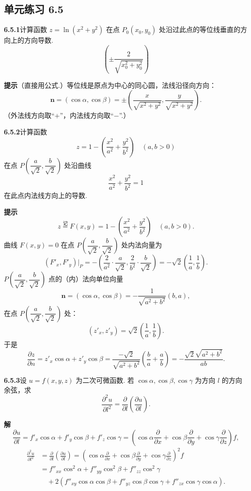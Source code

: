\documentclass[UTF8,12pt,a4paper,fontset=fandol]{ctexart}
\begin{document}
\subsection*{单元练习 6.5}

\noindent\textbf{6.5.1}\quad 计算函数 $z=\ln(x^2+y^2)$ 在点
$P_0(x_0,y_0)$ 处沿过此点的等位线垂直的方向上的方向导数.
\[
  \left(\pm\frac2{\sqrt{x_0^2+y_0^2}}\right)
\]

\noindent\textbf{提示}\quad （直接用公式.）等位线是原点为中心的同心圆，法线沿径向方向：
\[
  \mathbf n=(\cos\alpha,\cos\beta)
  =
  \pm\left(
  \frac{x}{\sqrt{x^2+y^2}},
  \frac{y}{\sqrt{x^2+y^2}}
  \right).
\]
（外法线方向取“$+$”，内法线方向取“$-$”.）

\noindent\textbf{6.5.2}\quad 计算函数
\[
  z=1-\left(\frac{x^2}{a^2}+\frac{y^2}{b^2}\right)\quad(a,b>0)
\]
在点 $P\left(\dfrac a{\sqrt2},\dfrac b{\sqrt2}\right)$ 处沿曲线
\[
  \frac{x^2}{a^2}+\frac{y^2}{b^2}=1
\]
在此点内法线方向上的导数.

\noindent\textbf{提示}\quad
\[
  z\overset{\text{记}}{=}F(x,y)=1-\left(\frac{x^2}{a^2}+\frac{y^2}{b^2}\right)\quad(a,b>0).
\]
曲线 $F(x,y)=0$ 在点
$P\left(\dfrac a{\sqrt2},\dfrac b{\sqrt2}\right)$ 处内法向量为
\[
  (F'_x,F'_y)\big|_P
  =
  -\left(\frac2{a^2}\cdot\frac a{\sqrt2},
  \frac2{b^2}\cdot\frac b{\sqrt2}\right)
  =
  -\sqrt2\left(\frac1a,\frac1b\right).
\]
$P\left(\dfrac a{\sqrt2},\dfrac b{\sqrt2}\right)$ 点的（内）法向单位向量
\[
  \mathbf n=(\cos\alpha,\cos\beta)
  =
  -\frac1{\sqrt{a^2+b^2}}(b,a),
\]
在点 $P\left(\dfrac a{\sqrt2},\dfrac b{\sqrt2}\right)$ 处：
\[
  (z'_x,z'_y)=\sqrt2\left(\frac1a,\frac1b\right).
\]
于是
\[
  \frac{\partial z}{\partial n}
  =
  z'_x\cos\alpha+z'_y\cos\beta
  =
  \frac{-\sqrt2}{\sqrt{a^2+b^2}}\left(\frac ba+\frac ab\right)
  =
  -\frac{\sqrt2\sqrt{a^2+b^2}}{ab}.
\]

\noindent\textbf{6.5.3}\quad 设 $u=f(x,y,z)$ 为二次可微函数. 若
$\cos\alpha,\cos\beta,\cos\gamma$ 为方向 $l$ 的方向余弦，求
\[
  \frac{\partial^2u}{\partial l^2}
  =
  \frac{\partial}{\partial l}\left(\frac{\partial u}{\partial l}\right).
\]

\noindent\textbf{解}\quad
\[
  \frac{\partial u}{\partial l}
  =
  f'_x\cos\alpha+f'_y\cos\beta+f'_z\cos\gamma
  =
  \left(
  \cos\alpha\frac{\partial}{\partial x}
  +\cos\beta\frac{\partial}{\partial y}
  +\cos\gamma\frac{\partial}{\partial z}
  \right)f,
\]
\[
\begin{aligned}
  \frac{\partial^2u}{\partial l^2}
  &=
  \frac{\partial}{\partial l}\left(\frac{\partial u}{\partial l}\right)
  =
  \left(
  \cos\alpha\frac{\partial}{\partial x}
  +\cos\beta\frac{\partial}{\partial y}
  +\cos\gamma\frac{\partial}{\partial z}
  \right)^2f\\
  &=
  f''_{xx}\cos^2\alpha+f''_{yy}\cos^2\beta+f''_{zz}\cos^2\gamma\\
  &\quad
  +2\left(
  f''_{xy}\cos\alpha\cos\beta+
  f''_{yz}\cos\beta\cos\gamma+
  f''_{zx}\cos\gamma\cos\alpha
  \right).
\end{aligned}
\]
\end{document}
